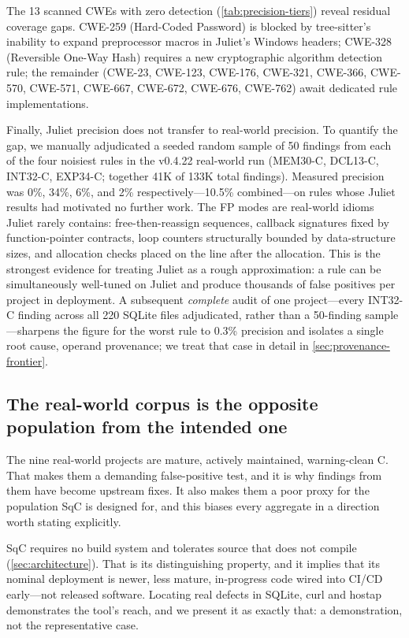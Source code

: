 The 13 scanned CWEs with zero detection (\cref{tab:precision-tiers})
reveal residual coverage gaps.  CWE-259 (Hard-Coded Password) is
blocked by tree-sitter's inability to expand preprocessor macros in
Juliet's Windows headers; CWE-328 (Reversible One-Way Hash) requires
a new cryptographic algorithm detection rule; the remainder (CWE-23,
CWE-123, CWE-176, CWE-321, CWE-366, CWE-570, CWE-571, CWE-667,
CWE-672, CWE-676, CWE-762) await dedicated rule implementations.

Finally, Juliet precision does not transfer to real-world precision.
To quantify the gap, we manually adjudicated a seeded random sample of
50 findings from each of the four noisiest rules in the v0.4.22
real-world run (MEM30-C, DCL13-C, INT32-C, EXP34-C; together 41K of
133K total findings).  Measured precision was 0\%, 34\%, 6\%, and 2\%
respectively---10.5\% combined---on rules whose Juliet results had
motivated no further work.  The FP modes are real-world idioms Juliet
rarely contains: free-then-reassign sequences, callback signatures
fixed by function-pointer contracts, loop counters structurally
bounded by data-structure sizes, and allocation checks placed on the
line after the allocation.  This is the strongest evidence for
treating Juliet as a rough approximation: a rule can be simultaneously
well-tuned on Juliet and produce thousands of false positives per
project in deployment.  A subsequent \emph{complete} audit of one
project---every INT32-C finding across all 220 SQLite files
adjudicated, rather than a 50-finding sample---sharpens the figure for
the worst rule to 0.3\% precision and isolates a single root cause,
operand provenance; we treat that case in detail in
\cref{sec:provenance-frontier}.

\subsection{The real-world corpus is the opposite population from the
intended one}
\label{sec:corpus-maturity}

The nine real-world projects are mature, actively maintained,
warning-clean C.  That makes them a demanding false-positive test, and
it is why findings from them have become upstream fixes.  It also makes
them a poor proxy for the population SqC is designed for, and this
biases every aggregate in a direction worth stating explicitly.

SqC requires no build system and tolerates source that does not
compile (\cref{sec:architecture}).  That is its distinguishing
property, and it implies that its nominal deployment is newer, less
mature, in-progress code wired into CI/CD early---not released
software.  Locating real defects in SQLite, curl and hostap
demonstrates the tool's reach, and we present it as exactly that: a
demonstration, not the representative case.

